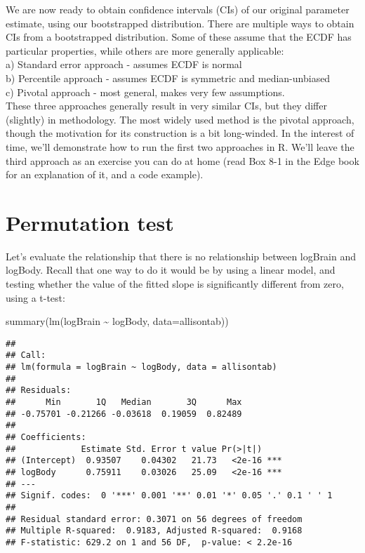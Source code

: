\documentclass[
]{book}
\newenvironment{Shaded}{\begin{snugshade}}{\end{snugshade}}
\newcommand{\AttributeTok}[1]{\textcolor[rgb]{0.77,0.63,0.00}{#1}}
\newcommand{\FunctionTok}[1]{\textcolor[rgb]{0.00,0.00,0.00}{#1}}
\newcommand{\NormalTok}[1]{#1}
\newcommand{\SpecialCharTok}[1]{\textcolor[rgb]{0.00,0.00,0.00}{#1}}
\begin{document}
We are now ready to obtain confidence intervals (CIs) of our original parameter estimate, using our bootstrapped distribution. There are multiple ways to obtain CIs from a bootstrapped distribution. Some of these assume that the ECDF has particular properties, while others are more generally applicable:\\
a) Standard error approach - assumes ECDF is normal\\
b) Percentile approach - assumes ECDF is symmetric and median-unbiased\\
c) Pivotal approach - most general, makes very few assumptions.\\
These three approaches generally result in very similar CIs, but they differ (slightly) in methodology. The most widely used method is the pivotal approach, though the motivation for its construction is a bit long-winded. In the interest of time, we'll demonstrate how to run the first two approaches in R. We'll leave the third approach as an exercise you can do at home (read Box 8-1 in the Edge book for an explanation of it, and a code example).

\hypertarget{permutation-test}{%
\section{Permutation test}\label{permutation-test}}

Let's evaluate the relationship that there is no relationship between logBrain and logBody. Recall that one way to do it would be by using a linear model, and testing whether the value of the fitted slope is significantly different from zero, using a t-test:

\begin{Shaded}
\begin{Highlighting}[]
\FunctionTok{summary}\NormalTok{(}\FunctionTok{lm}\NormalTok{(logBrain }\SpecialCharTok{\textasciitilde{}}\NormalTok{ logBody, }\AttributeTok{data=}\NormalTok{allisontab))}
\end{Highlighting}
\end{Shaded}

\begin{verbatim}
## 
## Call:
## lm(formula = logBrain ~ logBody, data = allisontab)
## 
## Residuals:
##      Min       1Q   Median       3Q      Max 
## -0.75701 -0.21266 -0.03618  0.19059  0.82489 
## 
## Coefficients:
##             Estimate Std. Error t value Pr(>|t|)    
## (Intercept)  0.93507    0.04302   21.73   <2e-16 ***
## logBody      0.75911    0.03026   25.09   <2e-16 ***
## ---
## Signif. codes:  0 '***' 0.001 '**' 0.01 '*' 0.05 '.' 0.1 ' ' 1
## 
## Residual standard error: 0.3071 on 56 degrees of freedom
## Multiple R-squared:  0.9183, Adjusted R-squared:  0.9168 
## F-statistic: 629.2 on 1 and 56 DF,  p-value: < 2.2e-16
\end{verbatim}
\end{document}
